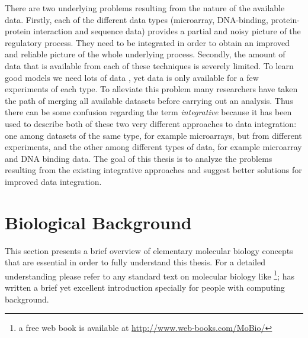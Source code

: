 There are two underlying problems resulting from the nature of the available data. Firstly, each of the different data types (microarray, DNA-binding, protein-protein interaction and sequence data) provides a partial and noisy picture of the regulatory process. They need to be integrated in order to obtain an improved and reliable picture of the whole underlying process. Secondly, the amount of data that is available from each of these techniques is severely limited. To learn good models we need lots of data \citep{yeung04fromexpr}, yet data is only available for a few experiments of each type. To alleviate this problem many researchers have taken the path of merging all available datasets before carrying out an analysis. Thus there can be some confusion regarding the term \textit{integrative} because it has been used to describe both of these two very different approaches to data integration: one among datasets of the same type, for example microarrays, but from different experiments, and the other among different types of data, for example microarray and DNA binding data. The goal of this thesis is to analyze the problems resulting from the existing integrative approaches and suggest better solutions for improved data integration.

\section{Biological Background}
This section presents a brief overview of elementary molecular biology concepts that are essential in order to fully understand this thesis. For a detailed understanding please refer to any standard text on molecular biology like \citet{alberts02molecular}\footnote{a free web book is available at \url{http://www.web-books.com/MoBio/}}; \citet{hunter_molbio93} has written a brief yet excellent introduction specially for people with computing background.

